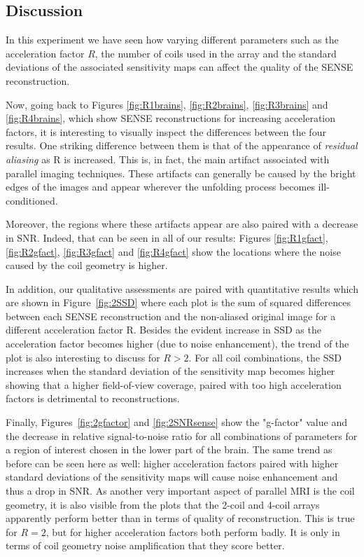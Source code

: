 \subsection{Discussion}
In this experiment we have seen how varying different parameters such as the acceleration factor $R$, the number of coils used in the array and the standard deviations of the associated sensitivity maps can affect the quality of the SENSE reconstruction. 

Now, going back to Figures \ref{fig:R1brains}, \ref{fig:R2brains}, \ref{fig:R3brains} and \ref{fig:R4brains}, which show SENSE reconstructions for increasing acceleration factors, it is interesting to visually inspect the differences between the four results. One striking difference between them is that of the appearance of \textit{residual aliasing} as R is increased. This is, in fact, the main artifact associated with parallel imaging techniques. These artifacts can generally be caused by the bright edges of the images and appear wherever the unfolding process becomes ill-conditioned. 

Moreover, the regions where these artifacts appear are also paired with a decrease in SNR. Indeed, that can be seen in all of our results: Figures \ref{fig:R1gfact}, \ref{fig:R2gfact}, \ref{fig:R3gfact} and \ref{fig:R4gfact} show the locations where the noise caused by the coil geometry is higher.

In addition, our qualitative assessments are paired with quantitative results which are shown in Figure~\ref{fig:2SSD} where each plot is the sum of squared differences between each SENSE reconstruction and the non-aliased original image for a different acceleration factor R. Besides the evident increase in SSD as the acceleration factor becomes higher (due to noise enhancement), the trend of the plot is also interesting to discuss for $R > 2$. For all coil combinations, the SSD increases when the standard deviation of the sensitivity map becomes higher showing that a higher field-of-view coverage, paired with too high acceleration factors is detrimental to reconstructions. 

Finally, Figures~\ref{fig:2gfactor} and \ref{fig:2SNRsense} show the "g-factor" value and the decrease in relative signal-to-noise ratio for all combinations of parameters for a region of interest chosen in the lower part of the brain. The same trend as before can be seen here as well: higher acceleration factors paired with higher standard deviations of the sensitivity maps will cause noise enhancement and thus a drop in SNR. As another very important aspect of parallel MRI is the coil geometry, it is also visible from the plots that the 2-coil and 4-coil arrays apparently perform better than in terms of quality of reconstruction. This is true for $R = 2$, but for higher acceleration factors both perform badly. It is only in terms of coil geometry noise amplification that they score better.

